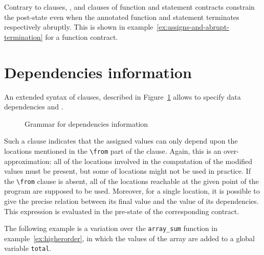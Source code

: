 Contrary to \ensures clauses, \assigns{}, 
\allocates{} and \frees{} clauses of function 
and statement contracts constrain the post-state 
even when the annotated function and statement terminates respectively abruptly. 
This is shown in example~\ref{ex:assigns-and-abrupt-termination} for a function contract.


\section{Dependencies information}
\label{sec:func-dep}

\experimental

An extended syntax of \assigns clauses, described in
Figure~\ref{fig:gram:dep} allows to specify data
dependencies and
.

\begin{figure}[t]
  \begin{cadre}
      
    \end{cadre}
  \caption{Grammar for dependencies information}
\label{fig:gram:dep}
\end{figure}

Such a clause indicates that the assigned values can only depend upon
the locations mentioned in the \lstinline|\from| part of the
clause. Again, this is an over-approximation: all of the locations
involved in the computation of the modified values must be present,
but some of locations might not be used in practice. If the
\lstinline|\from| clause is absent, all of the locations reachable at the
given point of the program are supposed to be used.
Moreover, for a single location, it is possible to give the precise
relation between its final value and the value of its
dependencies. This expression is evaluated in the pre-state of the
corresponding contract.

\begin{example}
  The following example is a variation over the \lstinline+array_sum+
  function in example~\ref{ex:higherorder}, in which the values of
  the array are added to a global variable \lstinline+total+.


\end{example}


